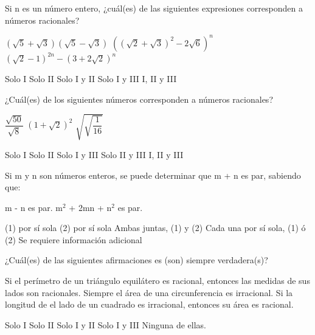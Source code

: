 \documentclass[pagina vacia]{srs}
\begin{document}
\begin{preguntas}[after-item-skip=1cm]
\pregunta Si n es un número entero, ¿cuál(es) de las siguientes expresiones corresponden a números racionales?
\begin{verticali}
\alternativa \( \left(\sqrt{5} + \sqrt{3}\right)\left(\sqrt{5} - \sqrt{3}\right) \)
\alternativa \( \left(\left(\sqrt{2} + \sqrt{3}\right)^2 - 2\sqrt{6}\right)^n \)
\alternativa \( \left(\sqrt{2}-1\right)^{2n} - \left(3 + 2\sqrt{2}\right)^n \)
\end{verticali}
\begin{vertical}
\alternativa Solo I
\alternativa Solo II
\alternativa Solo I y II
\alternativa Solo I y III
\alternativa I, II y III
\end{vertical}

\pregunta ¿Cuál(es) de los siguientes números corresponden a números racionales?
\begin{verticali}
\alternativa \( \dfrac{\sqrt{50}}{\sqrt{8}} \)
\alternativa \( \left(1 + \sqrt{2}\right)^2 \)
\alternativa \( \sqrt{\sqrt{\dfrac{1}{16}}} \)
\end{verticali}
\begin{vertical}
\alternativa Solo I
\alternativa Solo II
\alternativa Solo I y III
\alternativa Solo II y III
\alternativa I, II y III
\end{vertical}

\pregunta Si m y n son números enteros, se puede determinar que m + n es par, sabiendo que:
\begin{verticaln}
\alternativa m - n es par.
\alternativa m\(^2\) + 2mn + n\(^2\) es par.
\end{verticaln}
\begin{vertical}
\alternativa (1) por sí sola
\alternativa (2) por sí sola
\alternativa Ambas juntas, (1) y (2)
\alternativa Cada una por sí sola, (1) ó (2)
\alternativa Se requiere información adicional
\end{vertical}

\pregunta ¿Cuál(es) de las siguientes afirmaciones es (son) siempre verdadera(s)?
\begin{verticali}
\alternativa Si el perímetro de un triángulo equilátero es racional, entonces las medidas de sus lados son racionales.
\alternativa Siempre el área de una circunferencia es irracional.
\alternativa Si la longitud de el lado de un cuadrado es irracional, entonces su área es racional.
\end{verticali}
\begin{vertical}
\alternativa Solo I
\alternativa Solo II
\alternativa Solo I y II
\alternativa Solo I y III
\alternativa Ninguna de ellas.
\end{vertical}


\end{preguntas}
\end{document}
